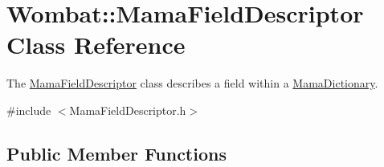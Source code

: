 \hypertarget{classWombat_1_1MamaFieldDescriptor}{
\section{Wombat::MamaFieldDescriptor Class Reference}
\label{classWombat_1_1MamaFieldDescriptor}
}


The {\ttfamily \hyperlink{classWombat_1_1MamaFieldDescriptor}{MamaFieldDescriptor}} class describes a field within a {\ttfamily \hyperlink{classWombat_1_1MamaDictionary}{MamaDictionary}}.  


{\ttfamily \#include $<$MamaFieldDescriptor.h$>$}\subsection*{Public Member Functions}

